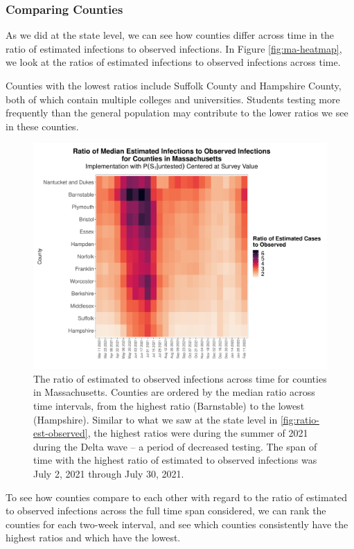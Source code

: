 \documentclass[12pt,twoside]{smiththesis}
\begin{document}
\hypertarget{comparing-counties}{%
\subsubsection{Comparing Counties}\label{comparing-counties}}

As we did at the state level, we can see how counties differ across time in the ratio of estimated infections to observed infections. In Figure \ref{fig:ma-heatmap}, we look at the ratios of estimated infections to observed infections across time.

Counties with the lowest ratios include Suffolk County and Hampshire County, both of which contain multiple colleges and universities. Students testing more frequently than the general population may contribute to the lower ratios we see in these counties.
\begin{figure}
\includegraphics[width=1\linewidth]{figure/ma_county_heatmap_ratio_est_observed} \caption{\label{fig:ma-heatmap} The ratio of estimated to observed infections across time for counties in Massachusetts. Counties are ordered by the median ratio across time intervals, from the highest ratio (Barnstable) to the lowest (Hampshire). Similar to what we saw at the state level in \ref{fig:ratio-est-observed}, the highest ratios were during the summer of 2021 during the Delta wave -- a period of decreased testing. The span of time with the highest ratio of estimated to observed infections was July 2, 2021 through July 30, 2021.}\label{fig:unnamed-chunk-94}
\end{figure}
To see how counties compare to each other with regard to the ratio of estimated to observed infections across the full time span considered, we can rank the counties for each two-week interval, and see which counties consistently have the highest ratios and which have the lowest.
\end{document}

